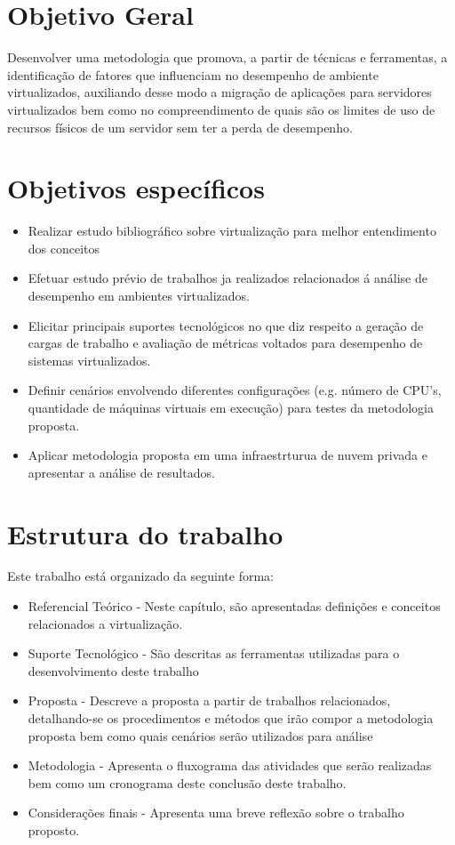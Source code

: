 \section{Objetivo Geral}
Desenvolver uma metodologia que promova, a partir de técnicas e ferramentas, a identificação de fatores que influenciam no desempenho de ambiente virtualizados, auxiliando desse modo a migração de aplicações para servidores virtualizados bem como no compreendimento de quais são os limites de uso de recursos físicos de um servidor sem ter a perda de desempenho.   
\section{Objetivos específicos}

\begin{itemize}
\item Realizar estudo bibliográfico sobre virtualização para melhor entendimento dos conceitos
\item Efetuar estudo prévio de trabalhos ja realizados relacionados á análise de desempenho em ambientes virtualizados.
\item Elicitar principais suportes tecnológicos no que diz respeito a geração de cargas de trabalho e avaliação de métricas voltados para desempenho de sistemas virtualizados.
\item Definir cenários envolvendo diferentes configurações (e.g. número de CPU's, quantidade de máquinas virtuais em execução) para testes da metodologia proposta.
\item Aplicar metodologia proposta em uma infraestrturua de nuvem privada e apresentar a análise de resultados.
\end{itemize}

\section{Estrutura do trabalho}

Este trabalho está organizado da seguinte forma:
\begin{itemize}
\item Referencial Teórico - Neste capítulo, são apresentadas definições e conceitos relacionados a virtualização.
\item Suporte Tecnológico - São descritas as ferramentas utilizadas para o desenvolvimento deste trabalho 
\item Proposta - Descreve a proposta a partir de trabalhos relacionados, detalhando-se os procedimentos e métodos que irão compor a metodologia proposta bem como quais cenários serão utilizados para análise
\item Metodologia - Apresenta o fluxograma das atividades que serão realizadas bem como um cronograma deste conclusão deste trabalho.
\item Considerações finais - Apresenta uma breve reflexão sobre o trabalho proposto.

\end{itemize}

